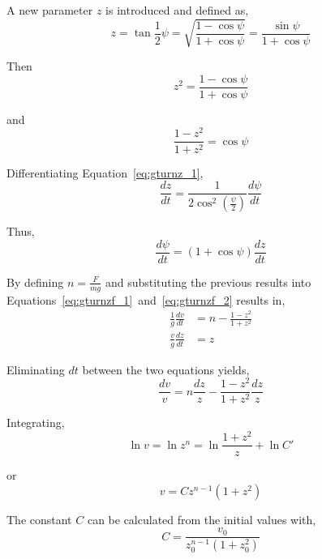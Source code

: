 A new parameter $z$ is introduced and defined as,
\begin{equation}
    \label{eq:gturnz_1}
    z = \tan{\frac{1}{2}\psi} 
      = \sqrt{\frac{1-\cos{\psi}}{1+\cos{\psi}}} 
      = \frac{\sin{\psi}}{1+\cos{\psi}}
\end{equation}

Then
\begin{equation}
    z^2 = \frac{1-\cos{\psi}}{1+\cos{\psi}}
\end{equation}

and
\begin{equation}
    \frac{1-z^2}{1+z^2}=\cos{\psi}
\end{equation}

Differentiating Equation~\eqref{eq:gturnz_1},
\begin{equation}
    \frac{dz}{dt} = \frac{1}{2 \cos^2{\left(\frac{\psi}{2}\right)}}\frac{d\psi}{dt}
\end{equation}

Thus,
\begin{equation}
    \frac{d\psi}{dt} = \left(1 + \cos \psi\right) \frac{dz}{dt}
\end{equation}


By defining $n=\frac{F}{mg}$ and substituting the previous results into Equations~\eqref{eq:gturnzf_1}~and~\eqref{eq:gturnzf_2} results in,
\begin{align}
    \frac{1}{g} \frac{dv}{dt} &= n-\frac{1-z^2}{1+z^2} \label{eq:gturnzf_3}\\
    \frac{v}{g} \frac{dz}{dt} &= z \label{eq:gturnzf_4}
\end{align}

Eliminating $dt$ between the two equations yields,
\begin{equation}
    \frac{dv}{v} = n\frac{dz}{z} - \frac{1-z^2}{1+z^2} \frac{dz}{z}
\end{equation}

Integrating,
\begin{equation}
    \ln v = \ln {z^n} = \ln {\frac{1+z^2}{z}} + \ln{C'}
\end{equation}

or
\begin{equation}
    \label{eq:gturnv}
    v=Cz^{n-1}\left(1 + z^2\right)
\end{equation}

The constant $C$ can be calculated from the initial values with,
\begin{equation}
    \label{eq:gturnc}
    C = \frac{v_0}{z_0^{n-1}\left(1 + z_0^2\right)}
\end{equation}

